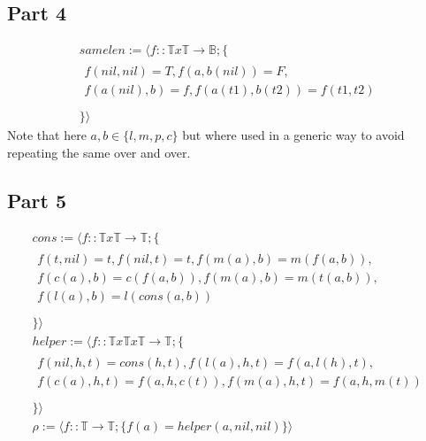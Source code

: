 \documentclass{article}
\begin{document}
\subsection{Part 4}
\[
\begin{array}{ll}
  samelen:=\langle f::\mathbb{T}x\mathbb{T}\rightarrow\mathbb{B}; \{\\
  \begin{array}{ll}
    f(nil,nil)=T,f(a,b(nil))=F,\\
    f(a(nil),b)=f,f(a(t1),b(t2))=f(t1,t2)\\
  \end{array}\\
  \} \rangle
\end{array}
\]
Note that here $a,b \in \{l,m,p,c\}$ but where used in a generic way to avoid repeating the same over and over.
\subsection{Part  5}
\[
\begin{array}{ll}
  cons:=\langle f::\mathbb{T}x\mathbb{T}\rightarrow\mathbb{T}; \{\\
  \begin{array}{ll}
    f(t,nil)=t,f(nil,t)=t,f(m(a),b)=m(f(a,b)),\\
    f(c(a),b)=c(f(a,b)),f(m(a),b)=m(t(a,b)),\\
    f(l(a),b)=l(cons(a,b))\\
  \end{array}\\
  \} \rangle\\
  helper:=\langle f::\mathbb{T}x\mathbb{T}x\mathbb{T}\rightarrow \mathbb{T}; \{\\
  \begin{array}{ll}
    f(nil,h,t)=cons(h,t),f(l(a),h,t)=f(a,l(h),t),\\
    f(c(a),h,t)=f(a,h,c(t)),f(m(a),h,t)=f(a,h,m(t))\\
  \end{array}\\
  \} \rangle\\
  \rho:=\langle f::\mathbb{T}\rightarrow\mathbb{T}; \{f(a)=helper(a,nil,nil)\}\rangle
\end{array}
\]
\end{document}
